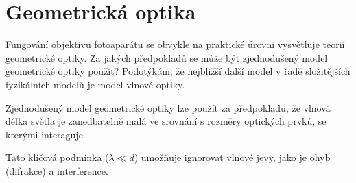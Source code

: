 \section{Geometrická optika}
Fungování objektivu fotoaparátu se obvykle na praktické úrovni vysvětluje teorií geometrické optiky. Za jakých 
předpokladů se může být zjednodušený model geometrické optiky použít? Podotýkám, že nejbližší další model v řadě 
složitějších fyzikálních modelů je model vlnové optiky.

Zjednodušený model geometrické optiky lze použít za předpokladu, že vlnová délka světla je zanedbatelně malá ve srovnání 
s rozměry optických prvků, se kterými interaguje.

Tato klíčová podmínka ($\lambda \ll d$) umožňuje ignorovat vlnové jevy, jako je ohyb (difrakce) a interference.